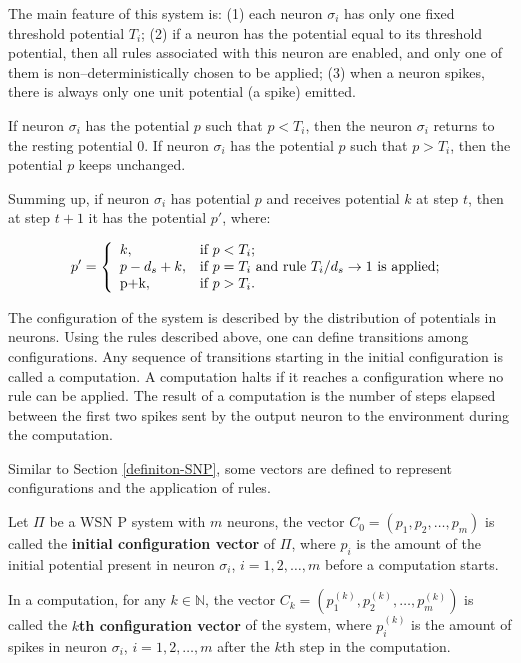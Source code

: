 \documentclass[runningheads]{llncs}
\begin{document}
The main feature of this system is: (1) each neuron $\sigma_i$ has
only one fixed threshold potential $T_i$; (2) if a neuron has the
potential equal to its threshold potential, then all rules
associated with this neuron are enabled, and only one of them is
non--deterministically chosen to be applied; (3) when a neuron
spikes, there is always only one unit potential (a spike) emitted.

If neuron $\sigma_i$ has the potential $p$ such that $p < T_i$, then
the neuron $\sigma_i$ returns to the resting potential 0. If neuron
$\sigma_i$ has the potential $p$ such that $p > T_i$, then the
potential $p$ keeps unchanged.

Summing up, if neuron $\sigma_i$ has potential $p$ and receives
potential $k$ at step $t$, then at step $t+1$ it has the potential
$p'$, where:


\begin{displaymath}
p'= \left\{ \begin{array}{ll} k, & \textrm{if $p<T_i$;}\\
p-d_s+k, & \textrm{if $p=T_i$ and rule $T_i/d_s\rightarrow 1$ is applied;} \\
$p+k$, & \textrm{if $p> T_i$.}
\end{array} \right.
\end{displaymath}

The configuration of the system is described by the distribution of
potentials in neurons. Using the rules described above, one can
define transitions among configurations. Any sequence of transitions
starting in the initial configuration is called a computation. A
computation halts if it reaches a configuration where no rule can be
applied. The result of a computation is the number of steps elapsed
between the first two spikes sent by the output neuron to the
environment during the computation.

Similar to Section \ref{definiton-SNP}, some vectors are defined to
represent configurations and the application of rules.

\begin{definition}
Let $\Pi$ be a WSN P system with $m$ neurons, the vector $C_{0} =
(p_{1}, p_{2}, \ldots , p_{m})$ is called the {\bf initial
configuration vector} of $\Pi$, where $p_{i}$ is the amount of the
initial potential present in neuron $\sigma_i$, $i=1,2, \ldots , m$
before a computation starts.

In a computation, for any $k \in \mathbb N$, the vector $C_{k} =
(p_{1}^{(k)}, p_{2}^{(k)}, \ldots , p_{m}^{(k)})$ is called the {\bf
$k$th configuration vector} of the system, where $p_{i}^{(k)}$ is
the amount of spikes in neuron $\sigma_i$, $i=1,2, \ldots, m$ after
the $k$th step in the computation.
\end{definition}
\end{document}
